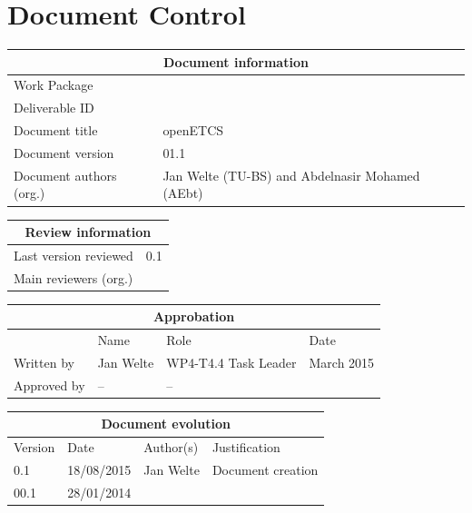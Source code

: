 \documentclass{template/openetcs_report}
\begin{document}
\begin{abstract}

\end{abstract}

\maketitle
\tableofcontents
\listoffiguresandtables
\newpage

\chapter{Document Control}

\begin{tabular}{|p{4.4cm}|p{8.7cm}|}
\hline
\multicolumn{2}{|c|}{Document information} \\
\hline
Work Package &    \\
Deliverable ID & \\
\hline
Document title & openETCS \\
Document version & 01.1 \\
Document authors (org.)  & Jan Welte (TU-BS) and Abdelnasir Mohamed (AEbt)\\
\hline
\end{tabular}

\begin{tabular}{|p{4.4cm}|p{8.7cm}|}
\hline
\multicolumn{2}{|c|}{Review information} \\
\hline
Last version reviewed & 0.1 \\
\hline
Main reviewers (org.) & \\
\hline
\end{tabular}

\begin{tabular}{|p{2.2cm}|p{4cm}|p{4cm}|p{2cm}|}
\hline
\multicolumn{4}{|c|}{Approbation} \\
\hline
  &  Name & Role & Date   \\
\hline  
Written by    &  Jan Welte & WP4-T4.4 Task Leader  &  March 2015\\
\hline
Approved by & -- & -- & \\
\hline
\end{tabular}

\begin{tabular}{|p{2.2cm}|p{2cm}|p{3cm}|p{5cm}|}
\hline
\multicolumn{4}{|c|}{Document evolution} \\
\hline
Version &  Date & Author(s) & Justification  \\
\hline
0.1 & 18/08/2015 & Jan Welte &  Document creation \\
\hline  
00.1 & 28/01/2014 &  &   \\

\hline  
\end{tabular}
\newpage
\end{document}
